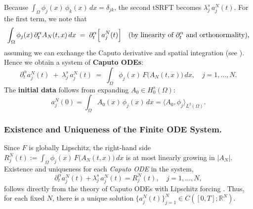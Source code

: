 \documentclass[12pt]{article}
\begin{document}
Because
\(\displaystyle \int_\Omega \phi_j(x)\,\phi_k(x)\,dx = \delta_{jk}\),
the second tSRFT becomes
\(\lambda_j^s\,a_j^N(t)\). For the first term, we note that
\[
\int_\Omega
  \phi_j(x)\,\partial_t^\alpha A_N(t,x)
\,dx
\;=\;
\partial_t^\alpha\Bigl[\,a_j^N(t)\Bigr]
\quad
(\text{by linearity of }\partial_t^\alpha \text{ and orthonormality}),
\]
assuming we can exchange the Caputo derivative and spatial integration
(see \cite[Sec.~2.3]{Diethelm2010}). Hence we obtain a system of
\textbf{Caputo ODEs}:
\[
\partial_t^\alpha a_j^N(t)
\;+\;
\lambda_j^s\,a_j^N(t)
\;=\;
\int_\Omega
  \phi_j(x)\,F\bigl(A_N(t,x)\bigr)
\,dx,
\quad
j=1,\dots,N.
\]
The \textbf{initial data} follows from expanding \(A_0\in H_0^s(\Omega)\):
\[
a_j^N(0)
= \int_\Omega A_0(x)\,\phi_j(x)\,dx
= \bigl\langle A_0,\phi_j\bigl\rangle_{L^2(\Omega)}.
\]

\subsubsection{Existence and Uniqueness of the Finite ODE System.}
Since \(F\) is globally Lipschitz, the right-hand side
\(\displaystyle
R_j^N(t) := \int_\Omega \phi_j(x)\,F\bigl(A_N(t,x)\bigr)\,dx
\)
is at most linearly growing in \(\lvert A_N\rvert\). Existence and uniqueness for each
\emph{Caputo ODE} in the system,
\[
\partial_t^\alpha a_j^N(t)
+ \lambda_j^s \,a_j^N(t)
= R_j^N(t),
\quad
j=1,\dots,N,
\]
follows directly from the theory of Caputo ODEs with Lipschitz forcing
\cite[Section~2.3]{Diethelm2010}. Thus, for each fixed \(N\), there is a unique solution
\(\{a_j^N(t)\}_{j=1}^N\in C([0,T];\mathbb{R}^N)\).
\end{document}
